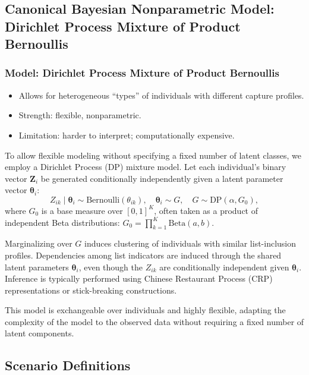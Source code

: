 \documentclass[
  12pt,
]{article}
\providecommand{\tightlist}{%
  \setlength{\itemsep}{0pt}\setlength{\parskip}{0pt}}\usepackage{longtable,booktabs,array}
\theoremstyle{plain}
\theoremstyle{definition}
\begin{document}
\subsection{Canonical Bayesian Nonparametric Model: Dirichlet Process
Mixture of Product
Bernoullis}\label{canonical-bayesian-nonparametric-model-dirichlet-process-mixture-of-product-bernoullis}

\subsubsection{Model: Dirichlet Process Mixture of Product
Bernoullis}\label{model-dirichlet-process-mixture-of-product-bernoullis}

\begin{itemize}
\tightlist
\item
  Allows for heterogeneous ``types'' of individuals with different
  capture profiles.
\item
  Strength: flexible, nonparametric.
\item
  Limitation: harder to interpret; computationally expensive.
\end{itemize}

To allow flexible modeling without specifying a fixed number of latent
classes, we employ a Dirichlet Process (DP) mixture model. Let each
individual's binary vector \(\mathbf{Z}_i\) be generated conditionally
independently given a latent parameter vector \(\boldsymbol{\theta}_i\):
\[
Z_{ik} \mid \boldsymbol{\theta}_i \sim \text{Bernoulli}(\theta_{ik}), \quad \boldsymbol{\theta}_i \sim G, \quad G \sim \text{DP}(\alpha, G_0),
\] where \(G_0\) is a base measure over \([0,1]^K\), often taken as a
product of independent Beta distributions:
\(G_0 = \prod_{k=1}^K \text{Beta}(a, b)\).

Marginalizing over \(G\) induces clustering of individuals with similar
list-inclusion profiles. Dependencies among list indicators are induced
through the shared latent parameters \(\boldsymbol{\theta}_i\), even
though the \(Z_{ik}\) are conditionally independent given
\(\boldsymbol{\theta}_i\). Inference is typically performed using
Chinese Restaurant Process (CRP) representations or stick-breaking
constructions.

This model is exchangeable over individuals and highly flexible,
adapting the complexity of the model to the observed data without
requiring a fixed number of latent components.

\subsection{Scenario Definitions}\label{scenario-definitions}
\end{document}
